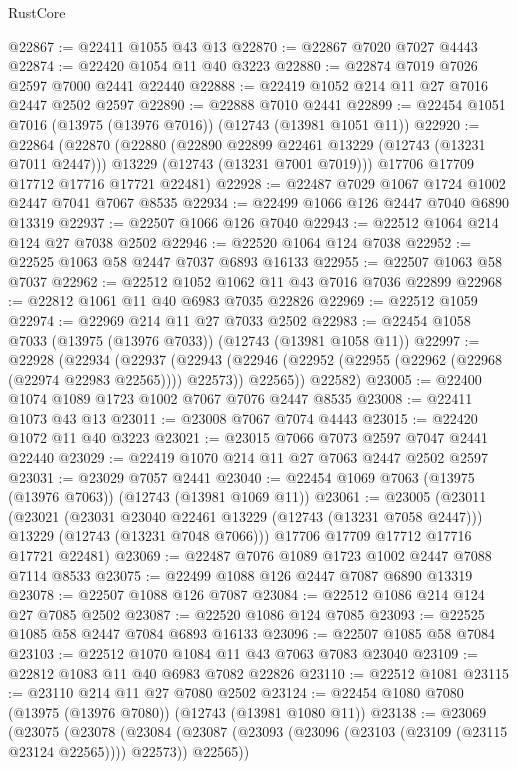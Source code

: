 \begin{lexlean}{RustCore}
\begin{coremodule}
@22867 := @22411 @1055 @43 @13
@22870 := @22867 @7020 @7027 @4443
@22874 := @22420 @1054 @11 @40 @3223
@22880 := @22874 @7019 @7026 @2597 @7000 @2441 @22440
@22888 := @22419 @1052 @214 @11 @27 @7016 @2447 @2502 @2597
@22890 := @22888 @7010 @2441
@22899 := @22454 @1051 @7016 (@13975 (@13976 @7016)) (@12743 (@13981 @1051 @11))
@22920 := @22864
    (@22870
      (@22880
        (@22890 @22899 @22461 @13229 (@12743 (@13231 @7011 @2447)))
        @13229
        (@12743 (@13231 @7001 @7019)))
      @17706
      @17709
      @17712
      @17716
      @17721
      @22481)
@22928 := @22487 @7029 @1067 @1724 @1002 @2447 @7041 @7067 @8535
@22934 := @22499 @1066 @126 @2447 @7040 @6890 @13319
@22937 := @22507 @1066 @126 @7040
@22943 := @22512 @1064 @214 @124 @27 @7038 @2502
@22946 := @22520 @1064 @124 @7038
@22952 := @22525 @1063 @58 @2447 @7037 @6893 @16133
@22955 := @22507 @1063 @58 @7037
@22962 := @22512 @1052 @1062 @11 @43 @7016 @7036 @22899
@22968 := @22812 @1061 @11 @40 @6983 @7035 @22826
@22969 := @22512 @1059
@22974 := @22969 @214 @11 @27 @7033 @2502
@22983 := @22454 @1058 @7033 (@13975 (@13976 @7033)) (@12743 (@13981 @1058 @11))
@22997 := @22928
    (@22934
      (@22937
        (@22943 (@22946 (@22952 (@22955 (@22962 (@22968 (@22974 @22983 @22565)))) @22573)) @22565))
      @22582)
@23005 := @22400 @1074 @1089 @1723 @1002 @7067 @7076 @2447 @8535
@23008 := @22411 @1073 @43 @13
@23011 := @23008 @7067 @7074 @4443
@23015 := @22420 @1072 @11 @40 @3223
@23021 := @23015 @7066 @7073 @2597 @7047 @2441 @22440
@23029 := @22419 @1070 @214 @11 @27 @7063 @2447 @2502 @2597
@23031 := @23029 @7057 @2441
@23040 := @22454 @1069 @7063 (@13975 (@13976 @7063)) (@12743 (@13981 @1069 @11))
@23061 := @23005
    (@23011
      (@23021
        (@23031 @23040 @22461 @13229 (@12743 (@13231 @7058 @2447)))
        @13229
        (@12743 (@13231 @7048 @7066)))
      @17706
      @17709
      @17712
      @17716
      @17721
      @22481)
@23069 := @22487 @7076 @1089 @1723 @1002 @2447 @7088 @7114 @8533
@23075 := @22499 @1088 @126 @2447 @7087 @6890 @13319
@23078 := @22507 @1088 @126 @7087
@23084 := @22512 @1086 @214 @124 @27 @7085 @2502
@23087 := @22520 @1086 @124 @7085
@23093 := @22525 @1085 @58 @2447 @7084 @6893 @16133
@23096 := @22507 @1085 @58 @7084
@23103 := @22512 @1070 @1084 @11 @43 @7063 @7083 @23040
@23109 := @22812 @1083 @11 @40 @6983 @7082 @22826
@23110 := @22512 @1081
@23115 := @23110 @214 @11 @27 @7080 @2502
@23124 := @22454 @1080 @7080 (@13975 (@13976 @7080)) (@12743 (@13981 @1080 @11))
@23138 := @23069
    (@23075
      (@23078
        (@23084 (@23087 (@23093 (@23096 (@23103 (@23109 (@23115 @23124 @22565)))) @22573)) @22565))

\end{coremodule}
\end{lexlean}
